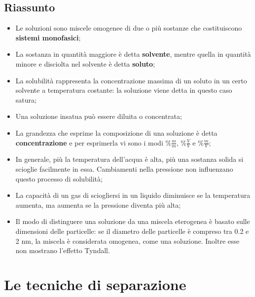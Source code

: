 \documentclass{article}
\begin{document}
\subsection{Riassunto}
\begin{itemize}
    \item Le soluzioni sono miscele omogenee di due o più sostanze che costituiscono
        \textbf{sistemi monofasici};
    \item La sostanza in quantità maggiore è detta \textbf{solvente}, mentre quella in quantità
        minore e disciolta nel solvente è detta \textbf{soluto};
    \item La solubilità rappresenta la concentrazione massima di un soluto in un certo solvente
        a temperatura costante: la soluzione viene detta in questo caso satura;
    \item Una soluzione insatua può essere diluita o concentrata;
    \item La grandezza che esprime la composizione di una soluzione è detta \textbf{concentrazione}
        e per esprimerla vi sono i modi $\% \frac{m}{m}$, $\% \frac{V}{V}$ e $\% \frac{m}{V}$;
    \item In generale, più la temperatura dell'acqua è alta, più una sostanza solida si scioglie
        facilmente in essa. Cambiamenti nella pressione non influenzano questo processo di solubilità;
    \item La capacità di un gas di sciogliersi in un liquido diminuisce se la temperatura aumenta,
        ma aumenta se la pressione diventa più alta;
    \item Il modo di distinguere una soluzione da una miscela eterogenea è basato sulle dimensioni
        delle particelle: se il diametro delle particelle è compreso tra 0.2 e 2 nm, la miscela
        è considerata omogenea, come una soluzione. Inoltre esse non mostrano l'effetto Tyndall.
\end{itemize}
\pagebreak

\hypertarget{tecniche di separazione}{}
\section{Le tecniche di separazione}
\end{document}
